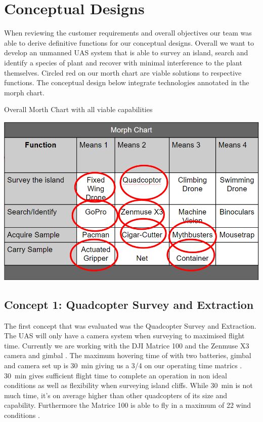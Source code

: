 \documentclass{wrcecapstone}
\begin{document}
\section{Conceptual Designs}
When reviewing the customer requirements and overall objectives our team was able to derive definitive functions for our conceptual  designs. Overall we want to develop an unmanned UAS system that is able to survey an island, search and identify a species of plant and recover with minimal interference to the plant themselves. Circled red on our morth chart are viable solutions to respective functions. The conceptual design below integrate technologies annotated in the morph chart.
\begin{table}
\caption{Overall Morth Chart with all viable capabilities}
\label{tab:4.1}
\begin{center}
\includegraphics[width=\columnwidth]{figures/table-41.png}
\end{center}
\end{table}


\subsection{Concept 1: Quadcopter Survey and Extraction}
The first concept that was evaluated was the Quadcopter Survey and Extraction. The UAS will only have a camera system when surveying to maximised flight time. Currently we are working with the DJI Matrice 100 and the Zenmuse X3 camera and gimbal \cite{dji2019zenmuse}.  The maximum hovering time of with two batteries, gimbal and camera set up is \SI{30}{\minute} giving us a 3/4 on our operating time matrics \cite{dji2019dji}. \SI{30}{\minute} gives sufficient flight time to complete an operation in non ideal conditions as well as flexibility when surveying island cliffs. While \SI{30}{\minute} is not much time, it's on average higher than other quadcopters of its size and capability. Furthermore the Matrice 100 is able to fly in a maximum of \SI{22}{\mph} wind conditions \cite{dji2016m100}.
\end{document}

